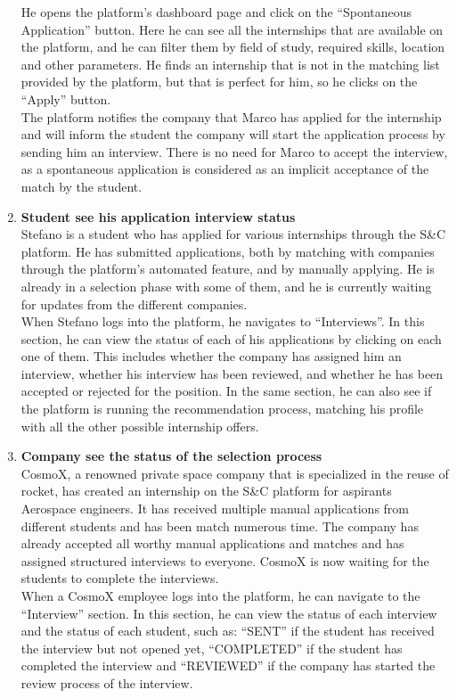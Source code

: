\begin{enumerate}
        He opens the platform's dashboard page and click on the “Spontaneous Application” button. Here he can see all the internships that are available on the platform, and he can filter them by field of study, required skills, location and other parameters.
        He finds an internship that is not in the matching list provided by the platform, but that is perfect for him, so he clicks on the “Apply” button.\\
        The platform notifies the company that Marco has applied for the internship and will inform the student the company will start the application process by sending him an interview. There is no need for Marco to accept the interview, as a spontaneous application is considered as an implicit acceptance of the match by the student.
    \item \textbf{\textcolor{titleColor}{Student see his application  interview status}}\\
        Stefano is a student who has applied for various internships through the S\&C platform. He has submitted applications, both by matching with companies through the platform's automated feature, and by manually applying. He is already in a selection phase with some of them, and he is currently waiting for updates from the different companies.\\
        When Stefano logs into the platform, he navigates to “Interviews”. In this section, he can view the status of each of his applications by clicking on each one of them. This includes whether the company has assigned him an interview, whether his interview has been reviewed, and whether he has been accepted or rejected for the position. In the same section, he can also see if the platform is running the recommendation process, matching his profile with all the other possible internship offers.
    \item \textbf{\textcolor{titleColor}{Company see the status of the selection process}}\\
        CosmoX, a renowned private space company that is specialized in the reuse of rocket, has created an internship on the S\&C platform for aspirants Aerospace engineers. It has received multiple manual applications from different students and has been match numerous time. The company has already accepted all worthy manual applications and matches and has assigned structured interviews to everyone. CosmoX is now waiting for the students to complete the interviews.\\
        When a CosmoX employee logs into the platform, he can navigate to the “Interview” section. In this section, he can view the status of each interview and the status of each student, such as: “SENT” if the student has received the interview but not opened yet, “COMPLETED” if the student has completed the interview and “REVIEWED” if the company has started the review process of the interview.

\end{enumerate}

